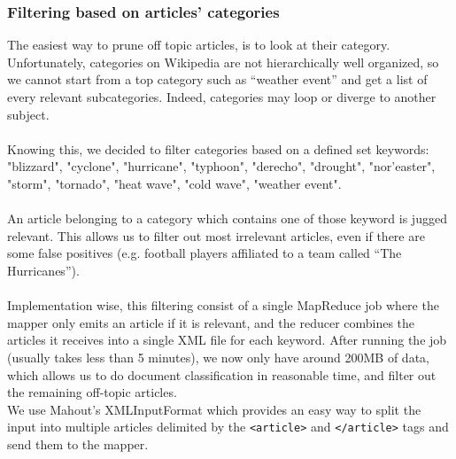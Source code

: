 \subsubsection{Filtering based on articles' categories}
The easiest way to prune off topic articles, is to look at their category. Unfortunately, categories on Wikipedia are not hierarchically well organized, so we cannot start from a top category such as ``weather event'' and get a list of every relevant subcategories. Indeed, categories may loop or diverge to another subject.\\\\
Knowing this, we decided to filter categories based on a defined set keywords: "blizzard", "cyclone", "hurricane", "typhoon", "derecho", "drought", "nor'easter", "storm", "tornado", "heat wave", "cold wave", "weather event". \\\\
An article belonging to a category which contains one of those keyword is jugged relevant. This allows us to filter out most irrelevant articles, even if there are some false positives (e.g. football players affiliated to a team called ``The Hurricanes'').\\\\
Implementation wise, this filtering consist of a single MapReduce job where the mapper only emits an article if it is relevant, and the reducer combines the articles it receives into a single XML file for each keyword. 
After running the job (usually takes less than 5 minutes), we now only have around 200MB of data, which allows us to do document classification in reasonable time, and filter out the remaining off-topic articles.\\ 
We use Mahout's XMLInputFormat which provides an easy way to split the input into multiple articles delimited by the \texttt{<article>} and \texttt{</article>} tags and send them to the mapper.
